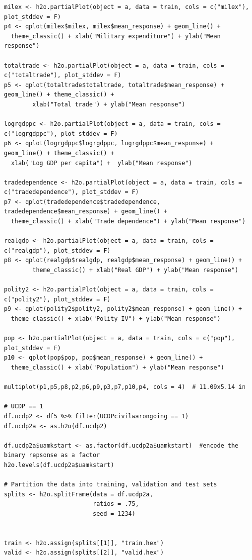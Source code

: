\begin{verbatim}
milex <- h2o.partialPlot(object = a, data = train, cols = c("milex"), plot_stddev = F)
p4 <- qplot(milex$milex, milex$mean_response) + geom_line() +
  theme_classic() + xlab("Military expenditure") + ylab("Mean response")

totaltrade <- h2o.partialPlot(object = a, data = train, cols = c("totaltrade"), plot_stddev = F)
p5 <- qplot(totaltrade$totaltrade, totaltrade$mean_response) + geom_line() + theme_classic() +
        xlab("Total trade") + ylab("Mean response")

logrgdppc <- h2o.partialPlot(object = a, data = train, cols = c("logrgdppc"), plot_stddev = F)
p6 <- qplot(logrgdppc$logrgdppc, logrgdppc$mean_response) + geom_line() + theme_classic() +
  xlab("Log GDP per capita") +  ylab("Mean response")

tradedependence <- h2o.partialPlot(object = a, data = train, cols = c("tradedependence"), plot_stddev = F)
p7 <- qplot(tradedependence$tradedependence, tradedependence$mean_response) + geom_line() +
  theme_classic() + xlab("Trade dependence") + ylab("Mean response")

realgdp <- h2o.partialPlot(object = a, data = train, cols = c("realgdp"), plot_stddev = F)
p8 <- qplot(realgdp$realgdp, realgdp$mean_response) + geom_line() +
        theme_classic() + xlab("Real GDP") + ylab("Mean response")

polity2 <- h2o.partialPlot(object = a, data = train, cols = c("polity2"), plot_stddev = F)
p9 <- qplot(polity2$polity2, polity2$mean_response) + geom_line() +
  theme_classic() + xlab("Polity IV") + ylab("Mean response")

pop <- h2o.partialPlot(object = a, data = train, cols = c("pop"), plot_stddev = F)
p10 <- qplot(pop$pop, pop$mean_response) + geom_line() +
  theme_classic() + xlab("Population") + ylab("Mean response")

multiplot(p1,p5,p8,p2,p6,p9,p3,p7,p10,p4, cols = 4)  # 11.09x5.14 in

# UCDP == 1
df.ucdp2 <- df5 %>% filter(UCDPcivilwarongoing == 1)
df.ucdp2a <- as.h2o(df.ucdp2)

df.ucdp2a$uamkstart <- as.factor(df.ucdp2a$uamkstart)  #encode the binary repsonse as a factor
h2o.levels(df.ucdp2a$uamkstart)

# Partition the data into training, validation and test sets
splits <- h2o.splitFrame(data = df.ucdp2a, 
                         ratios = .75,  
                         seed = 1234)  


train <- h2o.assign(splits[[1]], "train.hex")   
valid <- h2o.assign(splits[[2]], "valid.hex") 


\end{verbatim}
